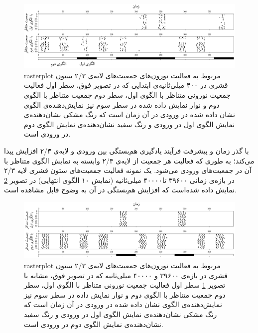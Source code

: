 \documentclass[12pt]{report}
\begin{document}
	\begin{figure}[]
		\centering
		\includegraphics[width=1.0\linewidth]{c1-begining.png}
		\caption[NS]{
			\gls{rasterplot} مربوط به فعالیت نورون‌های جمعیت‌های لایه‌ی ۲/۳ ستون قشری در ۴۰۰ میلی‌ثانیه‌ی ابتدایی که در تصویر فوق، سطر اول فعالیت جمعیت نورونی متناظر با الگوی اول، سطر دوم جمعیت متناظر با الگوی دوم و نوار نمایش داده شده در سطر سوم نیز نمایش‌دهنده‌ی الگوی نشان داده شده در ورودی در آن زمان است که رنگ مشکی نشان‌‌دهنده‌ی نمایش الگوی اول در ورودی و رنگ سفید نشان‌دهنده‌ی نمایش الگوی دوم در ورودی است.
		}
		\label{fig:c1-begining} 
	\end{figure}
	
	با گذر زمان و پیشرفت فرآیند یادگیری هم‌بستگی بین ورودی و لایه‌ی ۲/۳ افزایش پیدا می‌کند؛ به طوری که فعالیت هر جمعیت از لایه‌ی ۲/۳ وابسته به نمایش الگوی متناظر با آن در جمعیت‌های ورودی می‌شود. یک نمونه فعالیت جمعیت‌های ستون قشری لایه‌ ۲/۳ در بازه‌ی زمانی  ۳۹۶۰۰ تا۴۰۰۰۰ میلی‌ثانیه (نمایش ۱۰ الگوی انتهایی) در تصویر \ref{fig:c1-final} نمایش داده شده‌است که افزایش هم‌بستگی در آن به وضوح قابل مشاهده است.
	
	\begin{figure}[]
		\centering
		\includegraphics[width=1.0\linewidth]{c1-final.png}
		\caption[NS]{
			\gls{rasterplot} مربوط به فعالیت نورون‌های جمعیت‌های لایه‌ی ۲/۳ ستون قشری در بازه‌ی  ۳۹۶۰۰ و ۴۰۰۰۰ میلی‌ثانیه که در تصویر فوق، مشابه با تصویر \ref{fig:c1-begining} سطر اول فعالیت جمعیت نورونی متناظر با الگوی اول، سطر دوم جمعیت متناظر با الگوی دوم و نوار نمایش داده در سطر سوم نیز نمایش‌دهنده‌ی الگوی نشان داده شده در ورودی در آن زمان است که رنگ مشکی نشان‌‌دهنده‌ی نمایش الگوی اول در ورودی و رنگ سفید نشان‌دهنده‌ی نمایش الگوی دوم در ورودی است.
		}
		\label{fig:c1-final} 
	\end{figure}
	
\end{document}
